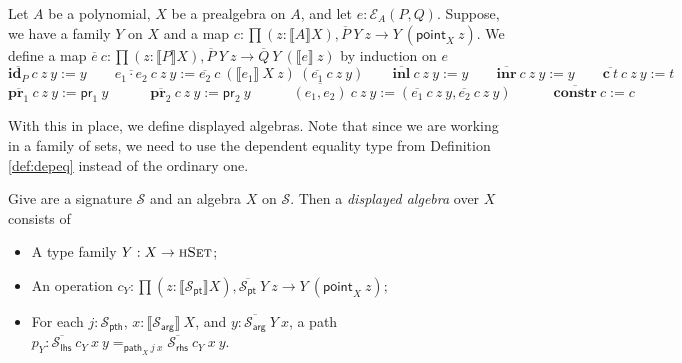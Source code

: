 \documentclass[9pt]{entcs}
\newcommand{\type}[1]{\textsc{#1}}
\newcommand{\constructor}[1]{\mathbf{#1}}
\newcommand{\nattranstxt}[1]{\mathsf{#1}}
\newcommand{\function}[1]{\mathsf{#1}}
\newcommand{\deprod}[3]{\prod(#1 : #2), #3} %
\newcommand{\hset}{\type{hSet}} %
\newcommand{\0}{\textbf{0}} %
\newcommand{\depeq}[3]{#2 =_{#1} #3} %
\newcommand{\Def}{:=} %
\newcommand{\prlt}{\nattranstxt{pr}_1} %
\newcommand{\prrt}{\nattranstxt{pr}_2} %
\newcommand{\ep}[3]{\mathcal{E}_{#1}(#2,#3)} %
\newcommand{\id}[1]{\constructor{id}_{#1}} %
\newcommand{\comp}[2]{#1 \cdot #2} %
\newcommand{\inle}{\constructor{inl}} %
\newcommand{\inre}{\constructor{inr}} %
\newcommand{\prle}{\constructor{pr}_1} %
\newcommand{\prre}{\constructor{pr}_2} %
\newcommand{\pair}[2]{(#1 , #2)} %
\newcommand{\Ce}{\constructor{c}} %
\newcommand{\constr}{\constructor{constr}} %
\newcommand{\pt}[0]{\textsf{pt}}
\newcommand{\pthI}[0]{\textsf{pth}}
\newcommand{\pthA}[0]{\textsf{arg}}
\newcommand{\pthlh}[0]{\textsf{lhs}}
\newcommand{\pthrh}[0]{\textsf{rhs}}
\newcommand{\pointc}[1]{#1_{\pt}} %
\newcommand{\pathI}[1]{#1_{\pthI}} %
\newcommand{\pathA}[1]{#1_{\pthA}} %
\newcommand{\pathlh}[1]{#1_{\pthlh}} %
\newcommand{\pathrh}[1]{#1_{\pthrh}} %
\newcommand{\sig}{\mathcal{S}} %
\newcommand{\semP}[1]{\llbracket #1 \rrbracket} %
\newcommand{\semE}[1]{\llbracket #1 \rrbracket} %
\newcommand{\constrA}[1]{\function{point}_{#1}} %
\newcommand{\constrP}[1]{\function{path}_{#1}} %
\newcommand{\polydact}[2]{\overline{#1} \> #2} %
\newcommand{\epdact}[2]{\overline{#1} \> #2} %
\newcommand{\remove}[1]{} %
\begin{document}
\begin{definition}
Let $A$ be a polynomial, $X$ be a prealgebra on $A$, and let $e : \ep{A}{P}{Q}$.
Suppose, we have a family $Y$ on $X$ and a map $c : \deprod{z}{\semP{A}{X}}{\polydact{P}{Y} \> z \rightarrow Y \> (\constrA{X} \> z)}$.
We define a map $\epdact{e}{c} : \deprod{z}{\semP{P}{X}}{\polydact{P}{Y} \> z \rightarrow \polydact{Q}{Y} \> (\semE{e} \> z)}$ by induction on $e$
\[
\epdact{\id{P}}{c} \> z \> y \Def y
\quad \quad
\epdact{\comp{e_1}{e_2}}{c} \> z \> y \Def \epdact{e_2}{c} \> (\semE{e_1} \> X \> z) \> (\epdact{e_1}{c} \> z \> y)
\quad \quad
\epdact{\inle}{c} \> z \> y \Def y
\quad \quad
\epdact{\inre}{c} \> z \> y \Def y
\quad \quad
\epdact{\Ce \> t}{c} \> z \> y \Def t
\]
\[
\epdact{\prle}{c} \> z \> y \Def \prlt \> y
\quad \quad \quad
\epdact{\prre}{c} \> z \> y \Def \prrt \> y
\quad \quad \quad
\epdact{\pair{e_1}{e_2}}{c} \> z \> y \Def (\epdact{e_1}{c} \> z \> y , \epdact{e_2}{c} \> z \> y)
\quad \quad \quad
\epdact{\constr}{c} \Def c
\]
\remove{
\begin{itemize}
	\item $\epdact{\id{P}}{c} \> z \> y \Def y$;
	\item $\epdact{\comp{e_1}{e_2}}{c} \> z \> y \Def \epdact{e_2}{c} \> (\semE{e} \> X \> z) \> (\epdact{e_1}{c} \> z \> y)$;
	\item $\epdact{\inle}{c} \> z \> y \Def y$;
	\item $\epdact{\inre}{c} \> z \> y \Def y$;
	\item $\epdact{\prle}{c} \> z \> y \Def \prlt \> y$;
	\item $\epdact{\prre}{c} \> z \> y \Def \prrt \> y$;
	\item $\epdact{\pair{e_1}{e_2}}{c} \> z \> y \Def (\epdact{e_1}{c} \> z \> y , \epdact{e_2}{c} \> z \> y)$;
	\item $\epdact{\Ce \> t}{c} \> z \> y \Def t$;
	\item $\epdact{\constr}{c} \Def c$.
\end{itemize}
}
\end{definition}

With this in place, we define displayed algebras.
Note that since we are working in a family of sets, we need to use the dependent equality type from Definition \ref{def:depeq} instead of the ordinary one.

\begin{definition}
Give are a signature $\sig$ and an algebra $X$ on $\sig$.
Then a \emph{displayed algebra} over $X$ consists of
\begin{itemize}
	\item A type family $Y : X \rightarrow \hset$;
	\item An operation $c_Y : \deprod{z}{\semP{\pointc{\sig}}{X}}{\polydact{\pointc{\sig}}{Y} \> z \rightarrow Y \> (\constrA{X} \> z)}$;
	\item For each $j : \pathI{\sig}$, $x : \semP{\pathA{\sig}} \> X$, and $y : \polydact{\pathA{\sig}}{Y} \> x$,  a path $p_Y : \depeq{\constrP{X} \> j \> x}{\epdact{\pathlh{\sig}}{c_Y} \> x \> y}{\epdact{\pathrh{\sig}}{c_Y} \> x \> y}$.
\end{itemize} 
\end{definition}
\end{document}
